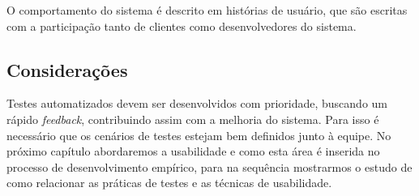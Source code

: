 O comportamento do sistema é descrito em histórias de usuário, que são 
escritas com a participação tanto de clientes como desenvolvedores do sistema. 


\subsection{Considerações}

Testes automatizados devem ser desenvolvidos com prioridade, buscando um rápido 
\textit{feedback}, contribuindo assim com a melhoria do sistema. Para isso é 
necessário que os cenários de testes estejam bem definidos junto à equipe.
%
No próximo capítulo abordaremos a usabilidade e como esta área é inserida no processo de desenvolvimento empírico, para na sequência mostrarmos o estudo de como relacionar as práticas de testes e as técnicas de usabilidade.

